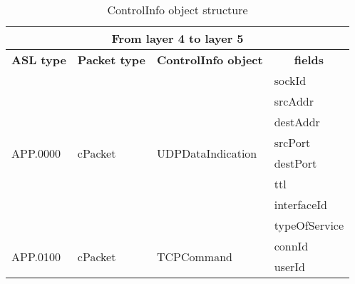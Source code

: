 \begin{table} [ppp]
\centering
\ttfamily
\footnotesize
\caption{ControlInfo object structure}
\label{tab:from4-to5}
\begin{tabular}{|l|l|l|l|}
\hline
\multicolumn{4}{|c|}{\normalfont\textbf{From layer 4 to layer 5}}	\\
\hline
\multicolumn{1}{|c|}{\normalfont\textbf{ASL type}}	&\multicolumn{1}{c|}{\normalfont\textbf{Packet type}}	&\multicolumn{1}{c|}{\normalfont\textbf{ControlInfo object}}		&\multicolumn{1}{c|}{\normalfont\textbf{fields}}\\
\hline
\multirow{8}{*}{APP.0000}	&\multirow{8}{*}{cPacket}		&\multirow{8}{*}{UDPDataIndication}		&sockId			\\
					&						&								&srcAddr	\\
					&						&								&destAddr	\\
					&						&								&srcPort	\\
					&						&								&destPort	\\
					&						&								&ttl	\\
					&						&								&interfaceId	\\
					&						&								&typeOfService	\\					
\hline
\multirow{2}{*}{APP.0100}	&\multirow{2}{*}{cPacket}		&\multirow{2}{*}{TCPCommand}	&connId			\\
					&						&								&userId	\\
\hline
\end{tabular}
\end{table}




